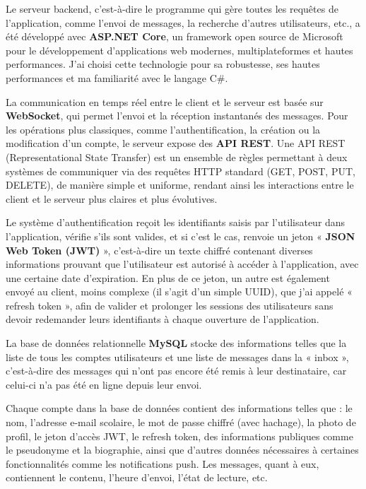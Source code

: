 \documentclass[12pt]{report}
\begin{document}
	Le serveur backend, c’est-à-dire le programme qui gère toutes les requêtes de l’application, comme l’envoi de messages, la recherche d’autres utilisateurs, etc., a été développé avec \textbf{ASP.NET Core}\supercite{aspnetcore}, un framework open source de Microsoft\supercite{microsoft} pour le développement d’applications web modernes, multiplateformes et hautes performances. J’ai choisi cette technologie pour sa robustesse, ses hautes performances et ma familiarité avec le langage C\#\supercite{csharp}.
	
	La communication en temps réel entre le client et le serveur est basée sur \textbf{WebSocket}\supercite{websocket}, qui permet l’envoi et la réception instantanés des messages. Pour les opérations plus classiques, comme l’authentification, la création ou la modification d’un compte, le serveur expose des \textbf{API REST}\supercite{apirest}. Une API REST (Representational State Transfer) est un ensemble de règles permettant à deux systèmes de communiquer via des requêtes HTTP standard (GET, POST, PUT, DELETE), de manière simple et uniforme, rendant ainsi les interactions entre le client et le serveur plus claires et plus évolutives.
	
	Le système d’authentification reçoit les identifiants saisis par l’utilisateur dans l’application, vérifie s’ils sont valides, et si c’est le cas, renvoie un jeton « \textbf{JSON Web Token (JWT)} »\supercite{http}, c’est-à-dire un texte chiffré contenant diverses informations prouvant que l’utilisateur est autorisé à accéder à l’application, avec une certaine date d’expiration. En plus de ce jeton, un autre est également envoyé au client, moins complexe (il s’agit d’un simple UUID\supercite{uuid}), que j’ai appelé « refresh token », afin de valider et prolonger les sessions des utilisateurs sans devoir redemander leurs identifiants à chaque ouverture de l’application.
	
	La base de données relationnelle \textbf{MySQL}\supercite{mysql} stocke des informations telles que la liste de tous les comptes utilisateurs et une liste de messages dans la « inbox », c’est-à-dire des messages qui n’ont pas encore été remis à leur destinataire, car celui-ci n’a pas été en ligne depuis leur envoi.
	
	Chaque compte dans la base de données contient des informations telles que : le nom, l’adresse e-mail scolaire, le mot de passe chiffré (avec hachage\supercite{bcrypt}), la photo de profil, le jeton d’accès JWT\supercite{jwt}, le refresh token, des informations publiques comme le pseudonyme et la biographie, ainsi que d’autres données nécessaires à certaines fonctionnalités comme les notifications push. Les messages, quant à eux, contiennent le contenu, l’heure d’envoi, l’état de lecture, etc.
	
\end{document}
